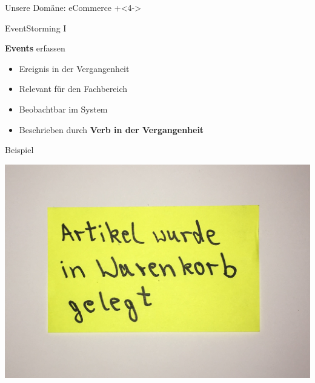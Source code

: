 \begin{frame}[fragile]{Unsere Domäne: eCommerce}
\onslide+<4->

\end{frame}


\begin{frame}[fragile]{EventStorming I}

\textbf{Events} erfassen

\begin{itemize}
\item Ereignis in der Vergangenheit
\item Relevant für den Fachbereich
\item Beobachtbar im System
\end{itemize}

\begin{itemize}
\item Beschrieben durch \textbf{Verb in der Vergangenheit}
\end{itemize}

\end{frame}

\begin{frame}[fragile]{Beispiel}

\begin{center}
\includegraphics[width=.5\textwidth]{pics/eventstorming1.jpg}
\end{center}

\end{frame}


